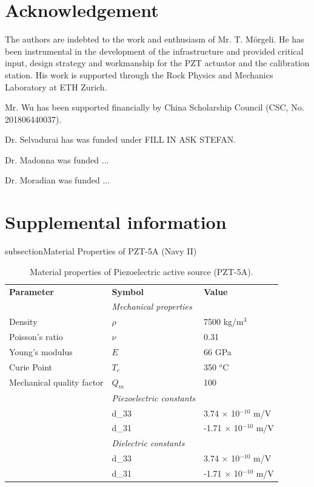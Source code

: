 \documentclass[preprint,3p, 11pt,authoryear]{elsarticle}
\begin{document}
\section*{Acknowledgement}
The authors are indebted to the work and enthusiasm of Mr. T. M\"orgeli. He has been instrumental in the development of the infrastructure and provided critical input, design strategy and workmanship for the PZT actuator and the calibration station. His work is supported through the Rock Physics and Mechanics Laboratory at ETH Zurich.

Mr. Wu has been supported financially by China Scholarship Council (CSC, No. 201806440037). 

Dr. Selvadurai has was funded under FILL IN ASK STEFAN. 

Dr. Madonna was funded ...

Dr. Moradian was funded ...
 

 


\clearpage
\section*{Supplemental information}

\*subsection{Material Properties of PZT-5A (Navy II) }
\begin{table}[ht]
	\centering
	\caption{Material properties of Piezoelectric active source (PZT-5A).}
	\begin{tabular}{ m{5cm} m{2cm} m{4cm}} 
		\hline  
		\bf{Parameter} 		      & \bf{Symbol} 	  & \bf{Value}	\\
	   & \textit{Mechanical properties} & \\
	    Density                   & $\rho$            & 7500 kg/m$^{3}$\\
	    Poisson's ratio           & $\nu$             & 0.31\\
	    Young's modulus           & $E$               & 66 GPa\\
        Curie Point               & $T_{c}$           & 350 $^{o}$C\\  
        Mechanical quality factor &   $Q_{m}$         & 100\\
	  & \textit{Piezoelectric constants} & \\
 	  & d_{33}                   & 3.74 $\times$ 10$^{-10}$ m/V\\
 	  & d_{31}                   & -1.71 $\times$ 10$^{-10}$ m/V\\
	  & \textit{Dielectric constants} & \\
 	  & d_{33}                   & 3.74 $\times$ 10$^{-10}$ m/V\\
 	  & d_{31}                   & -1.71 $\times$ 10$^{-10}$ m/V\\

	       
		\hline  	
	\end{tabular}
	\label{table1}
\end{table}
\end{document}
